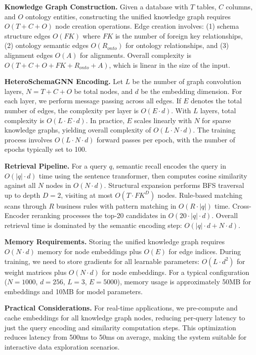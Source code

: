 \documentclass[sigconf, nonatbib]{acmart}
\begin{document}
\textbf{Knowledge Graph Construction.} Given a database with $T$ tables, $C$ columns, and $O$ ontology entities, constructing the unified knowledge graph requires $O(T + C + O)$ node creation operations. Edge creation involves: (1) schema structure edges $O(FK)$ where $FK$ is the number of foreign key relationships, (2) ontology semantic edges $O(R_{onto})$ for ontology relationships, and (3) alignment edges $O(A)$ for alignments. Overall complexity is $O(T + C + O + FK + R_{onto} + A)$, which is linear in the size of the input.

\textbf{HeteroSchemaGNN Encoding.} Let $L$ be the number of graph convolution layers, $N = T + C + O$ be total nodes, and $d$ be the embedding dimension. For each layer, we perform message passing across all edges. If $E$ denotes the total number of edges, the complexity per layer is $O(E \cdot d)$. With $L$ layers, total complexity is $O(L \cdot E \cdot d)$. In practice, $E$ scales linearly with $N$ for sparse knowledge graphs, yielding overall complexity of $O(L \cdot N \cdot d)$. The training process involves $O(L \cdot N \cdot d)$ forward passes per epoch, with the number of epochs typically set to 100.

\textbf{Retrieval Pipeline.} For a query $q$, semantic recall encodes the query in $O(|q| \cdot d)$ time using the sentence transformer, then computes cosine similarity against all $N$ nodes in $O(N \cdot d)$. Structural expansion performs BFS traversal up to depth $D=2$, visiting at most $O(T \cdot FK^D)$ nodes. Rule-based matching scans through $R$ business rules with pattern matching in $O(R \cdot |q|)$ time. Cross-Encoder reranking processes the top-20 candidates in $O(20 \cdot |q| \cdot d)$. Overall retrieval time is dominated by the semantic encoding step: $O(|q| \cdot d + N \cdot d)$.

\textbf{Memory Requirements.} Storing the unified knowledge graph requires $O(N \cdot d)$ memory for node embeddings plus $O(E)$ for edge indices. During training, we need to store gradients for all learnable parameters: $O(L \cdot d^2)$ for weight matrices plus $O(N \cdot d)$ for node embeddings. For a typical configuration ($N=1000$, $d=256$, $L=3$, $E=5000$), memory usage is approximately 50MB for embeddings and 10MB for model parameters.

\textbf{Practical Considerations.} For real-time applications, we pre-compute and cache embeddings for all knowledge graph nodes, reducing per-query latency to just the query encoding and similarity computation steps. This optimization reduces latency from 500ms to 50ms on average, making the system suitable for interactive data exploration scenarios.
\end{document}
